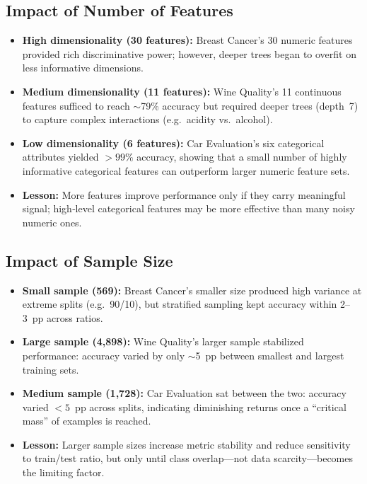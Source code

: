 \subsection{Impact of Number of Features}
\begin{itemize}
	\item \textbf{High dimensionality (30 features):}
	      Breast Cancer’s 30 numeric features provided rich discriminative power; however, deeper trees began to overfit on less informative dimensions.
	\item \textbf{Medium dimensionality (11 features):}
	      Wine Quality’s 11 continuous features sufficed to reach $\sim$79\% accuracy but required deeper trees (depth 7) to capture complex interactions (e.g.\ acidity vs.\ alcohol).
	\item \textbf{Low dimensionality (6 features):}
	      Car Evaluation’s six categorical attributes yielded \(>99\%\) accuracy, showing that a small number of highly informative categorical features can outperform larger numeric feature sets.
	\item \textbf{Lesson:}
	      More features improve performance only if they carry meaningful signal; high‑level categorical features may be more effective than many noisy numeric ones.
\end{itemize}

\subsection{Impact of Sample Size}
\begin{itemize}
	\item \textbf{Small sample (569):}
	      Breast Cancer’s smaller size produced high variance at extreme splits (e.g.\ 90/10), but stratified sampling kept accuracy within 2–3 pp across ratios.
	\item \textbf{Large sample (4,898):}
	      Wine Quality’s larger sample stabilized performance: accuracy varied by only $\sim$5 pp between smallest and largest training sets.
	\item \textbf{Medium sample (1,728):}
	      Car Evaluation sat between the two: accuracy varied \(<5\) pp across splits, indicating diminishing returns once a “critical mass” of examples is reached.
	\item \textbf{Lesson:}
	      Larger sample sizes increase metric stability and reduce sensitivity to train/test ratio, but only until class overlap—not data scarcity—becomes the limiting factor.
\end{itemize}

